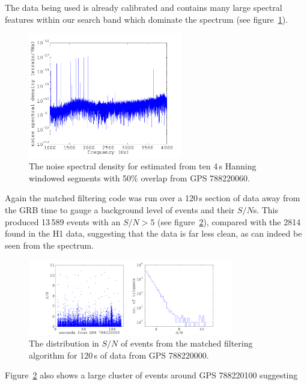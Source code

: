 The \geo data being used is already calibrated and contains many large spectral features within our
search band which dominate the spectrum (see figure~\ref{GEOSpectrumRingdownSearch}).
\begin{figure}[!htbp]
\begin{center}
\includegraphics[width=0.6\textwidth]{figs/GEOSpectrumRingdownSearch}\caption[The noise spectral
density for \geo from GPS 788220060.]{The noise spectral density for \geo estimated from ten 4\,s
Hanning windowed segments with 50\% overlap from GPS 788220060.}\label{GEOSpectrumRingdownSearch}
\end{center}
\end{figure}
Again the matched filtering code was run over a 120\,s section of data away from the GRB time to
gauge a background level of events and their $S/N$s. This produced 13\,589 events with an $S/N > 5$
(see figure~\ref{GEORingdownBgSNR}), compared with the 2814 found in the H1 data, suggesting that
the \geo data is far less clean, as can indeed be seen from the spectrum.
\begin{figure}[!htbp]
\begin{center}
\includegraphics[width=0.8\textwidth]{figs/GEORingdownBgSNR}\caption{The distribution in $S/N$ of
events from the matched filtering algorithm for 120\,s of \geo data from GPS
788220000.}\label{GEORingdownBgSNR}
\end{center}
\end{figure}
Figure~\ref{GEORingdownBgSNR} also shows a large cluster of events around GPS 788220100 suggesting
